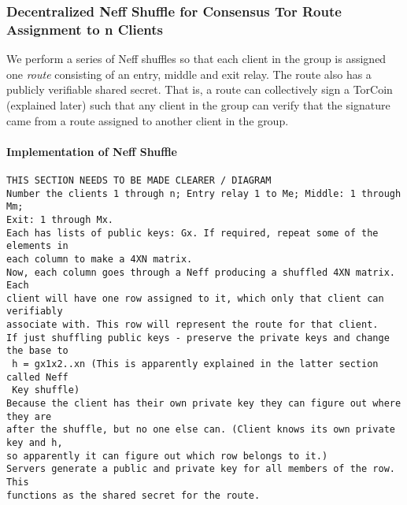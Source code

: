 \subsubsection{Decentralized Neff Shuffle for Consensus Tor Route Assignment to n Clients}
We perform a series of Neff shuffles so that each client in the group is assigned one \textit{route} consisting of an entry, middle and exit relay. The route also has a publicly verifiable shared secret. That is, a route can collectively sign a TorCoin (explained later) such that any client in the group can verify that the signature came from a route assigned to another client in the group.

\paragraph{Implementation of Neff Shuffle}
\begin{verbatim}
THIS SECTION NEEDS TO BE MADE CLEARER / DIAGRAM
Number the clients 1 through n; Entry relay 1 to Me; Middle: 1 through Mm; 
Exit: 1 through Mx.
Each has lists of public keys: Gx. If required, repeat some of the elements in 
each column to make a 4XN matrix.
Now, each column goes through a Neff producing a shuffled 4XN matrix. Each 
client will have one row assigned to it, which only that client can verifiably 
associate with. This row will represent the route for that client.
If just shuffling public keys - preserve the private keys and change the base to
 h = gx1x2..xn (This is apparently explained in the latter section called Neff 
 Key shuffle)
Because the client has their own private key they can figure out where they are 
after the shuffle, but no one else can. (Client knows its own private key and h,
so apparently it can figure out which row belongs to it.)
Servers generate a public and private key for all members of the row. This 
functions as the shared secret for the route.
\end{verbatim}

